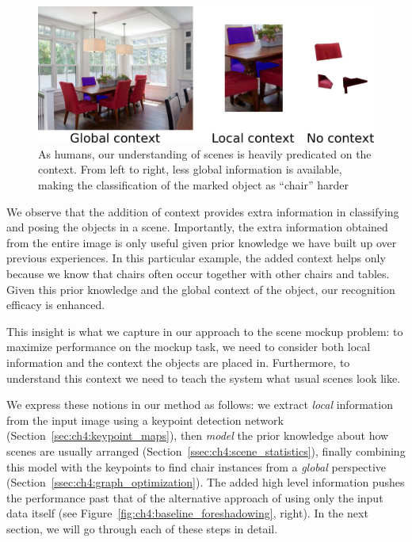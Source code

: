 \documentclass[10pt,twocolumn,letterpaper]{article}
\begin{document}
\begin{figure}
    \includegraphics[width=\linewidth]{figures/context_example/context_example}
    \caption[Decreasing context]{As humans, our understanding of scenes is heavily predicated on
    the context. From left to right, less global information is available,
making the classification of the marked object as ``chair'' harder}
    \label{fig:ch4:context_example}
\end{figure}

We observe that the addition of context provides extra information in classifying and
posing the objects in a scene.   Importantly,
the extra information obtained from the entire image is only useful
given prior knowledge we have built up over previous experiences.  In this
particular example, the added context helps only because we know that chairs
often occur together with other chairs and tables.  Given this prior knowledge
and the global context of the object, our recognition efficacy is enhanced.

This insight is what we capture in our approach to the scene mockup problem: to
maximize performance on the mockup task, we need to consider both local
information and the context the objects are placed in. Furthermore, to
understand this context we need to teach the system what usual scenes look like.

We express these notions in our method as follows: we  extract \emph{local}
information from the input image using a keypoint detection network
(Section~\ref{sec:ch4:keypoint_maps}), then \emph{model} the prior knowledge
about how scenes are usually arranged (Section~\ref{ssec:ch4:scene_statistics}),
finally combining this model with the keypoints to find chair instances from a
\emph{global} perspective (Section~\ref{ssec:ch4:graph_optimization}).  The
added high level information pushes the performance past that of the
alternative approach of using only the input data itself (see
Figure~\ref{fig:ch4:baseline_foreshadowing}, right).  In the next section, we
will go through each of these steps in detail.
\end{document}
